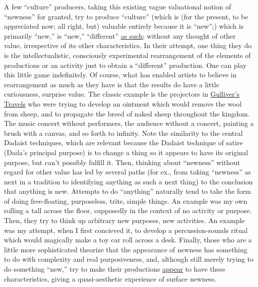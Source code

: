 A few \enquote{culture} producers, taking this existing vague
valuational notion of \enquote{newness} for granted, try to produce \enquote{culture}
(which is (for the present, to be appreciated now; all 
right, but) valuable entirely because it is \enquote{new};) which is
primarily \enquote{new,} is \enquote{new,} \enquote{different} \uline{as such}; without any
thought of other value, irrespective of its other characteristics.
In their attempt, one thing they do is the intellectualistic,
consciously experimental rearrangement of the elements of productions
or an activity just to obtain a \enquote{different} production.
One can play this little game indefinitely. Of course, what has
enabled artists to believe in rearrangement as much as they have
is that the results do have a little curiousness, surprise value.
The classic example is the projectors in \uline{Gulliver's Travels} who 
were trying to develop an ointment which would remove the wool
from sheep, and to propagate the breed of naked sheep throughout
the kingdom. The music concert without performers, the audience
without a concert, painting a brush with a canvas, and so forth
to infinity. Note the similarity to the central Dadaist techniques,
which are relevant because the Dadaist technique of satire (Dada's
principal purpose) is to change a thing so it appears to have its
original purpose, but can't possibly fulfill it. Then, thinking
about \enquote{newness} without regard for other value has led by several
paths (for ex., from taking \enquote{newness} as next in a tradition to
identifying anything as such a next thing) to the conclusion that
anything is new. Attempts to do \enquote{anything} naturally tend to take
the form of doing free-floating, purposeless, trite, simple things.
An example was my own rolling a tall across the floor, supposedly 
in the context of no activity or purpose. Then, they try to think
up arbitrary new purposes, new activities. An example was my 
attempt, when I first concieved it, to develop a percussion-sounds
ritual which would magically make a toy car roll across a desk. 
Finally, those who are a little more sophisticated theorize that
the appearance of newness has something to do with complexity and 
real purposiveness, and, although still merely trying to do 
something \enquote{new,} try to make their productions \uline{appear} to have these characteristics, giving a quasi-aesthetic experience of surface newness.


